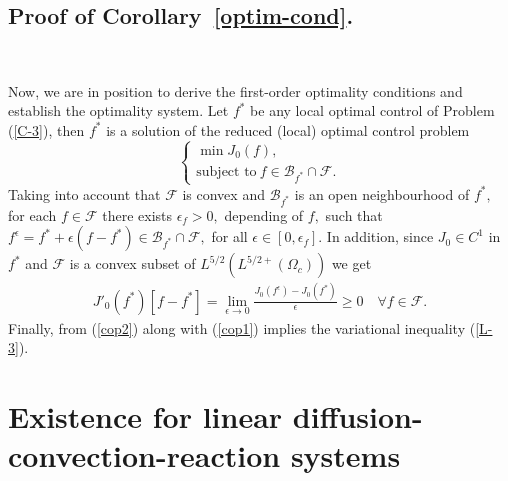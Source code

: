 \documentclass[11pt,reqno]{amsart}%
\numberwithin{equation}{section}
\begin{document}
{\subsection{%
Proof of Corollary~\ref{optim-cond}.} \label{Sec:optim-cond}

\

Now, we are in position to derive the first-order optimality conditions and establish the optimality system. 
%
Let $f^*$ be any local optimal control of Problem (\ref{C-3}), then $f^*$ is a solution of the reduced (local) optimal control problem 
\begin{equation}\label{C-3b}
\left\{
\begin{array}{lc}
\min J_0(f),\\
\mbox{subject to}\ f\in \mathcal{B}_{f^*}\cap \mathcal{F}.
\end{array}
\right.
\end{equation}
Taking into account that $\mathcal{F}$ is convex and $\mathcal{B}_{f^*}$ is an open  neighbourhood of $f^*,$ for each $f\in \mathcal{F}$ there exists $\epsilon_f>0,$ depending of $f,$ such that $f^\epsilon=f^*+\epsilon(f-f^*)\in \mathcal{B}_{f^*}\cap\mathcal{F},$ for all $\epsilon\in [0,\epsilon_f]$.
In addition,  since $J_0\in C^1$ in $f^*$  and $\mathcal{F}$ is a convex subset of $L^{5/2}(L^{5/2+}(\Omega_c))$ we get
\begin{eqnarray}\label{cop1}
J'_0(f^*)[f-f^*]
=\lim_{\epsilon\rightarrow 0}\frac{J_0(f^\epsilon)-J_0(f^*)}{\epsilon}\geq 0\quad \forall f\in \mathcal{F}.
\end{eqnarray}
Finally, from (\ref{cop2}) along with (\ref{cop1}) implies the variational inequality (\ref{L-3}).

\bigskip

\appendix

\section{Existence for linear diffusion-convection-reaction systems}\label{AppendixA}

}
\end{document}

